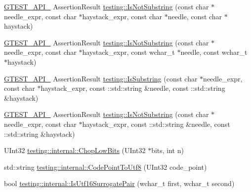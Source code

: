 \begin{DoxyCompactItemize}
\item 
\mbox{\hyperlink{_obj__test_2lib_2googletest-release-1_88_81_2googletest_2include_2gtest_2internal_2gtest-port_8h_aa73be6f0ba4a7456180a94904ce17790}{G\+T\+E\+S\+T\+\_\+\+A\+P\+I\+\_\+}} Assertion\+Result \mbox{\hyperlink{namespacetesting_a2288dcf4249f88af67dcd46544dc49a6}{testing\+::\+Is\+Not\+Substring}} (const char $\ast$needle\+\_\+expr, const char $\ast$haystack\+\_\+expr, const char $\ast$needle, const char $\ast$haystack)
\item 
\mbox{\hyperlink{_obj__test_2lib_2googletest-release-1_88_81_2googletest_2include_2gtest_2internal_2gtest-port_8h_aa73be6f0ba4a7456180a94904ce17790}{G\+T\+E\+S\+T\+\_\+\+A\+P\+I\+\_\+}} Assertion\+Result \mbox{\hyperlink{namespacetesting_a53e5c6e91ea429c43de7f4f57e33d166}{testing\+::\+Is\+Not\+Substring}} (const char $\ast$needle\+\_\+expr, const char $\ast$haystack\+\_\+expr, const wchar\+\_\+t $\ast$needle, const wchar\+\_\+t $\ast$haystack)
\item 
\mbox{\hyperlink{_obj__test_2lib_2googletest-release-1_88_81_2googletest_2include_2gtest_2internal_2gtest-port_8h_aa73be6f0ba4a7456180a94904ce17790}{G\+T\+E\+S\+T\+\_\+\+A\+P\+I\+\_\+}} Assertion\+Result \mbox{\hyperlink{namespacetesting_a571c7edcfc574269833ebe3e7d338ec5}{testing\+::\+Is\+Substring}} (const char $\ast$needle\+\_\+expr, const char $\ast$haystack\+\_\+expr, const \+::std\+::string \&needle, const \+::std\+::string \&haystack)
\item 
\mbox{\hyperlink{_obj__test_2lib_2googletest-release-1_88_81_2googletest_2include_2gtest_2internal_2gtest-port_8h_aa73be6f0ba4a7456180a94904ce17790}{G\+T\+E\+S\+T\+\_\+\+A\+P\+I\+\_\+}} Assertion\+Result \mbox{\hyperlink{namespacetesting_abe7b3fa1c9528745f934d4a14155ea87}{testing\+::\+Is\+Not\+Substring}} (const char $\ast$needle\+\_\+expr, const char $\ast$haystack\+\_\+expr, const \+::std\+::string \&needle, const \+::std\+::string \&haystack)
\item 
U\+Int32 \mbox{\hyperlink{namespacetesting_1_1internal_a2c54b453387aa8a18f2f3e09f10b5a7d}{testing\+::internal\+::\+Chop\+Low\+Bits}} (U\+Int32 $\ast$bits, int n)
\item 
std\+::string \mbox{\hyperlink{namespacetesting_1_1internal_a0c0f9558efb9abb965851c4738cdc725}{testing\+::internal\+::\+Code\+Point\+To\+Utf8}} (U\+Int32 code\+\_\+point)
\item 
bool \mbox{\hyperlink{namespacetesting_1_1internal_a681895f8cc32286211be9889da107394}{testing\+::internal\+::\+Is\+Utf16\+Surrogate\+Pair}} (wchar\+\_\+t first, wchar\+\_\+t second)

\end{DoxyCompactItemize}
